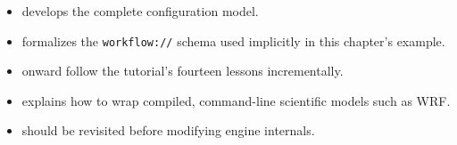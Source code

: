 \begin{itemize}[leftmargin=1.4em]
  \item {} develops the complete configuration model.
  \item {} formalizes the \texttt{workflow://} schema used
    implicitly in this chapter's example.
  \item {} onward follow the tutorial's fourteen
    lessons incrementally.
  \item {} explains how to wrap compiled,
    command-line scientific models such as WRF.
  \item {} should be revisited before modifying engine
    internals.
\end{itemize}
